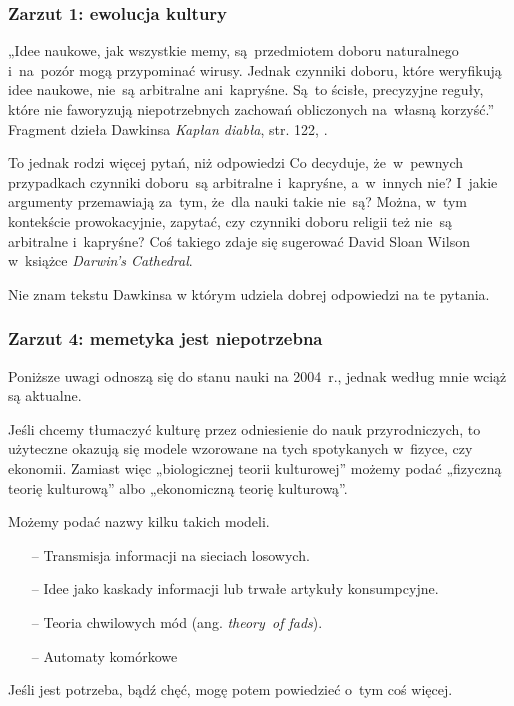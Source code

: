 \documentclass[10pt,t]{beamer}
\begin{document}
\begin{frame}
  \frametitle{Zarzut 1: ewolucja kultury}


  „Idee naukowe, jak wszystkie memy, są~przedmiotem doboru naturalnego
  i~na~pozór mogą przypominać wirusy. Jednak czynniki doboru, które
  weryfikują idee naukowe, nie~są arbitralne ani~kapryśne. Są~to ścisłe,
  precyzyjne reguły, które nie faworyzują niepotrzebnych zachowań
  obliczonych na~własną korzyść.” Fragment dzieła Dawkinsa
  \textit{Kapłan diabła}, str. 122, \cite{McGrathBogDawkinsa2008}.

  To jednak rodzi więcej pytań, niż odpowiedzi Co decyduje, że~w~pewnych
  przypadkach czynniki doboru~są
  arbitralne i~kapryśne, a~w~innych nie? I~jakie argumenty
  przemawiają za~tym, że~dla nauki takie nie~są? Można, w~tym
  kontekście prowokacyjnie, zapytać, czy czynniki doboru religii też
  nie~są arbitralne i~kapryśne? Coś takiego zdaje się sugerować David Sloan
  Wilson w~książce \textit{Darwin's Cathedral}.

  Nie znam tekstu Dawkinsa w którym udziela dobrej odpowiedzi na te pytania.

\end{frame}





\begin{frame}
  \frametitle{Zarzut 4: memetyka jest niepotrzebna}


  Poniższe uwagi odnoszą się do stanu nauki na 2004~r., jednak według mnie
  wciąż są aktualne.

  Jeśli chcemy tłumaczyć kulturę przez odniesienie do nauk przyrodniczych,
  to użyteczne okazują się modele wzorowane na tych spotykanych w~fizyce,
  czy ekonomii. Zamiast więc „biologicznej teorii kulturowej” możemy podać
  „fizyczną teorię kulturową” albo „ekonomiczną teorię kulturową”.

  Możemy podać nazwy kilku takich modeli.
  \begin{itemize}

  \item[--] Transmisja informacji na sieciach losowych.

  \item[--] Idee jako kaskady informacji lub trwałe artykuły
    konsumpcyjne.

  \item[--] Teoria chwilowych mód (ang. \textit{theory~of fads}).

  \item[--] Automaty komórkowe

  \end{itemize}

  Jeśli jest potrzeba, bądź chęć, mogę potem powiedzieć o~tym coś
  więcej.

\end{frame}
\end{document}

